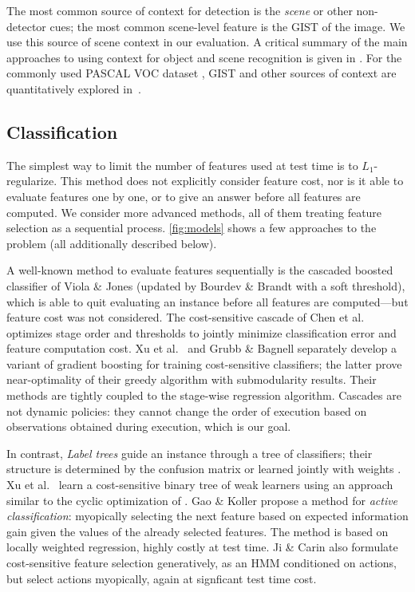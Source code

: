 The most common source of context for detection is the \emph{scene} or other non-detector cues; the most common scene-level feature is the GIST \cite{Oliva-IJCV-2001} of the image.
We use this source of scene context in our evaluation.
A critical summary of the main approaches to using context for object and scene recognition is given in \cite{Galleguillos2010}.
For the commonly used PASCAL VOC dataset \cite{pascal-voc-2010}, GIST and other sources of context are quantitatively explored in~\cite{Divvala2009}.

\subsection{Classification}



The simplest way to limit the number of features used at test time is to $L_1$-regularize.
This method does not explicitly consider feature cost, nor is it able to evaluate features one by one, or to give an answer before all features are computed.
We consider more advanced methods, all of them treating feature selection as a sequential process.
\autoref{fig:models} shows a few approaches to the problem (all additionally described below).

A well-known method to evaluate features sequentially is the cascaded boosted classifier of Viola \& Jones \parencite{Viola2004} (updated by Bourdev \& Brandt \parencite{Bourdev-CVPR-2005} with a soft threshold), which is able to quit evaluating an instance before all features are computed---but feature cost was not considered.
The cost-sensitive cascade of Chen et al.\ \parencite{Chen-AISTATS-2012} optimizes stage order and thresholds to jointly minimize classification error and feature computation cost.
Xu et al.\ \parencite{Xu-ICML-2012} and Grubb \& Bagnell \parencite{Grubb-AISTATS-2012} separately develop a variant of gradient boosting for training cost-sensitive classifiers; the latter prove near-optimality of their greedy algorithm with submodularity results.
Their methods are tightly coupled to the stage-wise regression algorithm.
Cascades are not dynamic policies: they cannot change the order of execution based on observations obtained during execution, which is our goal.

In contrast, \emph{Label trees} guide an instance through a tree of classifiers; their structure is determined by the confusion matrix or learned jointly with weights \parencite{Deng-NIPS-2011}.
Xu et al.\ \parencite{Xu-ICML-2013} learn a cost-sensitive binary tree of weak learners using an approach similar to the cyclic optimization of \parencite{Chen-AISTATS-2012}.
Gao \& Koller \parencite{Gao-NIPS-2011} propose a method for \emph{active classification}: myopically selecting the next feature based on expected information gain given the values of the already selected features.
The method is based on locally weighted regression, highly costly at test time.
Ji \& Carin \parencite{Ji-PR-2007} also formulate cost-sensitive feature selection generatively, as an HMM conditioned on actions, but select actions myopically, again at signficant test time cost.

